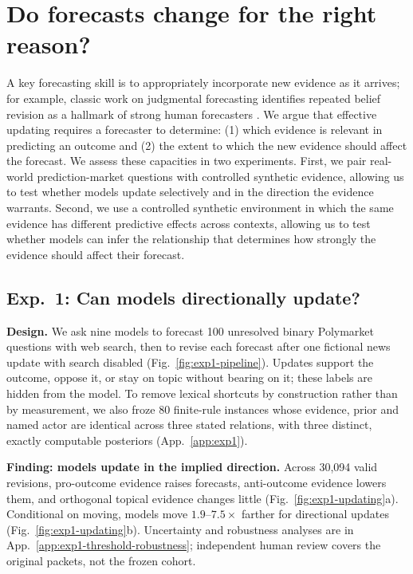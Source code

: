 \documentclass{article}
\begin{document}
\section{Do forecasts change for the right reason?}
\label{sec:evidence}

A key forecasting skill is to appropriately incorporate new evidence as it
arrives; for example, classic work on judgmental forecasting identifies repeated
belief revision as a hallmark of strong human forecasters
\citep{tetlock2005expert}. We argue that effective updating requires a forecaster
to determine: (1) which evidence is relevant in predicting an outcome and (2) the
extent to which the new evidence should affect the forecast. We assess these
capacities in two experiments. First, we pair real-world prediction-market
questions with controlled synthetic evidence, allowing us to test whether models
update selectively and in the direction the evidence warrants. Second, we use a
controlled synthetic environment in which the same evidence has different
predictive effects across contexts, allowing us to test whether models can infer
the relationship that determines how strongly the evidence should affect their
forecast.

\subsection{Exp.~1: Can models directionally update?}
\label{sec:exp1}

\noindent\textbf{Design.}
We ask nine models to forecast 100 unresolved binary Polymarket questions with
web search, then to revise each forecast after one fictional news update with
search disabled (Fig.~\ref{fig:exp1-pipeline}). Updates support the outcome,
oppose it, or stay on topic without bearing on it; these labels are hidden from
the model. To remove lexical shortcuts by construction rather than by
measurement, we also froze 80 finite-rule instances whose evidence, prior and
named actor are identical across three stated relations, with three distinct,
exactly computable posteriors (App.~\ref{app:exp1}).

\noindent\textbf{Finding: models update in the implied direction.}
Across 30,094 valid revisions, pro-outcome evidence raises forecasts,
anti-outcome evidence lowers them, and orthogonal topical evidence changes
little (Fig.~\ref{fig:exp1-updating}a). Conditional on moving, models move
$1.9$--$7.5\times$ farther for directional updates
(Fig.~\ref{fig:exp1-updating}b). Uncertainty and robustness analyses are in
App.~\ref{app:exp1-threshold-robustness}; independent human review covers the
original packets, not the frozen cohort.
\end{document}
